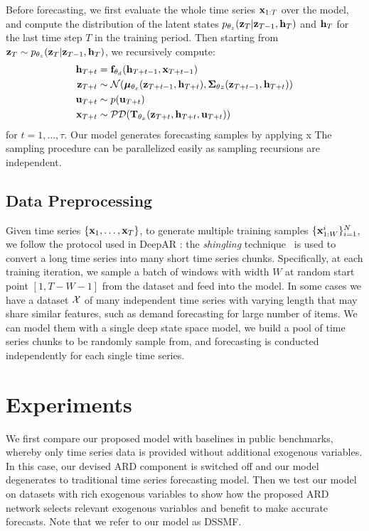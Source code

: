 \documentclass{article}
\begin{document}
Before forecasting, we first evaluate the whole time series $\bx_{1:T}$ over the model, and compute the distribution of the latent states $\pT[z](\bz_T|\bz_{T-1}, \bh_{T})$ and $\bh_T$ for the last time step $T$ in the training period. Then starting from $\bz_T\sim\pT[z](\bz_T|\bz_{T-1}, \bh_{T})$, we recursively compute:
\begin{equation}\label{eq:mc_forecast}
    \begin{split}
        \bh_{T+t} &= \mathbf{f}_{\bt[d]}(\bh_{T+t-1}, \bx_{T+t-1})\\
        \bz_{T+t} &\sim \mcN(\bmu_{\bt[z]}(\bz_{T+t-1},\bh_{T+t}),\bm{\Sigma}_{\bt{z}}(\bz_{T+t-1},\bh_{T+t}))\\
        \bu_{T+t} &\sim p(\bu_{T+t})\\
        \bx_{T+t} &\sim \mathcal{PD}(\mathbf{T}_{\bt[x]}(\bz_{T+t},\bh_{T+t}, \bu_{T+t}))
    \end{split}
\end{equation}
for $t=1,\dots,\tau$. Our model generates forecasting samples by applying x The sampling procedure can be parallelized easily as sampling recursions are independent.

\subsection{Data Preprocessing}
Given time series $\{\bx_{1},\dots,\bx_{T}\}$, to generate multiple training samples $\{\bx_{1:W}^{i}\}_{i=1}^{N}$, we follow the protocol used in DeepAR \cite{flunkert2017deepar}: the \textit{shingling} technique~\cite{leskovec2014mining} is used to convert a long time series into many short time series chunks. Specifically, at each training iteration, we sample a batch of windows with width $W$ at random start point $[1,T-W-1]$ from the dataset and feed into the model. In some cases we have a dataset $\mcX$ of many independent time series with varying length that may share similar features, such as demand forecasting for large number of items. We can model them with a single deep state space model, we build a pool of time series chunks to be randomly sample from, and forecasting is conducted independently for each single time series.



\section{Experiments}
We first compare our proposed model with baselines in public benchmarks, whereby only time series data is provided without additional exogenous variables. In this case, our devised ARD component is switched off and our model degenerates to traditional time series forecasting model. Then we test our model on datasets with rich exogenous variables to show how the proposed ARD network selects relevant exogenous variables and benefit to make accurate forecasts. Note that we refer to our model as DSSMF.
\end{document}
